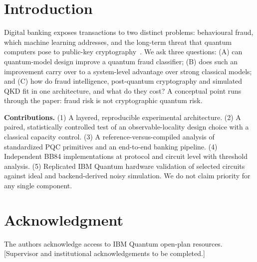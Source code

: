 \documentclass[conference]{IEEEtran}
\begin{document}
\section{Introduction}\label{sec:intro}
Digital banking exposes transactions to two distinct problems: behavioural fraud, which machine learning addresses, and the long-term threat that quantum computers pose to public-key cryptography~\cite{shor,mosca}. We ask three questions: (A) can quantum-model design improve a quantum fraud classifier; (B) does such an improvement carry over to a system-level advantage over strong classical models; and (C) how do fraud intelligence, post-quantum cryptography and simulated QKD fit in one architecture, and what do they cost? A conceptual point runs through the paper: fraud risk is not cryptographic quantum risk.

\textbf{Contributions.} (1) A layered, reproducible experimental architecture. (2) A paired, statistically controlled test of an observable-locality design choice with a classical capacity control. (3) A reference-versus-compiled analysis of standardized PQC primitives and an end-to-end banking pipeline. (4) Independent BB84 implementations at protocol and circuit level with threshold analysis. (5) Replicated IBM Quantum hardware validation of selected circuits against ideal and backend-derived noisy simulation. We do not claim priority for any single component.














\section*{Acknowledgment}
The authors acknowledge access to IBM Quantum open-plan resources. [Supervisor and institutional acknowledgements to be completed.]



\end{document}
